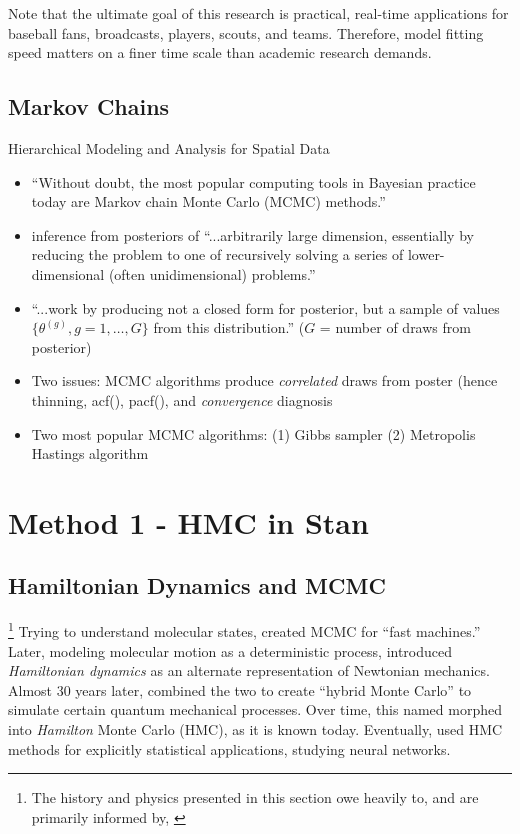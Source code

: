 \documentclass{article}
\begin{document}
Note that the ultimate goal of this research is practical, real-time applications for baseball fans, broadcasts, players, scouts, and teams. Therefore, model fitting speed matters on a finer time scale than academic research demands.  

\subsection{Markov Chains}

Hierarchical Modeling and Analysis for Spatial Data \citep{Banerjee2014}
        \begin{itemize} %
        \item ``Without doubt, the most popular computing tools in Bayesian practice today are Markov chain Monte Carlo (MCMC) methods.'' 
        \item inference from posteriors of ``...arbitrarily large dimension, essentially by reducing the problem to one of recursively solving a series of lower-dimensional (often unidimensional) problems.'' 
        \item ``...work by producing not a closed form for posterior, but a sample of values $\{\theta^{(g)}, g = 1, \dots, G\}$ from this distribution.'' ($G$ = number of draws from posterior) 
        \item Two issues: MCMC algorithms produce {\it correlated} draws from poster (hence thinning, acf(), pacf(), and {\it convergence} diagnosis 
        \item Two most popular MCMC algorithms: (1) Gibbs sampler (2) Metropolis Hastings algorithm
        \end{itemize} %
        
\section{Method 1 - HMC in Stan} %

\subsection{Hamiltonian Dynamics and MCMC} %

\footnote{The history and physics presented in this section owe heavily to, and are primarily informed by, \citep{Neal2011}} Trying to understand molecular states, \cite{Metropolis1953} created MCMC for ``fast machines.'' Later, modeling molecular motion as a deterministic process, \cite{Alder1959} introduced {\it Hamiltonian dynamics} as an alternate representation of Newtonian mechanics. Almost 30 years later, \cite{Duane1987} combined the two to create ``hybrid Monte Carlo'' to simulate certain quantum mechanical processes. Over time, this named morphed into {\it Hamilton} Monte Carlo (HMC), as it is known today. Eventually, \cite{Neal1996} used HMC methods for explicitly statistical applications, studying neural networks.
\end{document}
